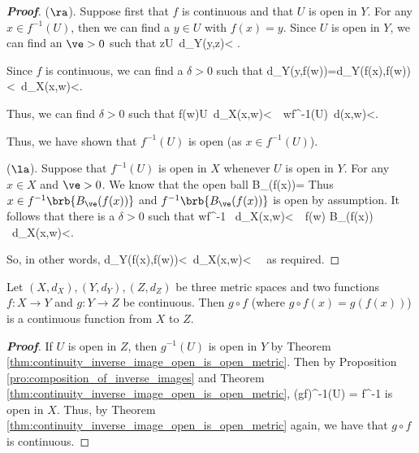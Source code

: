 \begin{proof}[\bf Proof]
($\ra$). Suppose first that $f$ is continuous and that $U$ is open in $Y$. For any $x\in f^{-1}(U)$, then we can find a $y\in U$ with $f(x)=y$. Since $U$ is open in $Y$, we can find an $\ve>0$ such that
\be
z\in U\quad {}\ d_Y(y,z)< \ve.
\ee

Since $f$ is continuous, we can find a $\delta>0$ such that
\be
d_Y(y,f(w))=d_Y(f(x),f(w))<\ve \quad {}\ d_X(x,w)<\delta.
\ee

Thus, we can find $\delta >0$ such that
\be
f(w)\in U\quad {}\ d_X(x,w)<\delta \ \ra \ w\in f^{-1}(U)\quad {}\ d(x,w)<\delta.
\ee

Thus, we have shown that $f^{-1}(U)$ is open (as $x\in f^{-1}(U)$).

($\la$). Suppose that $f^{-1}(U)$ is open in $X$ whenever $U$ is open in $Y$. For any $x\in X$ and $\ve>0$. We know that the open ball
\be
B_\ve(f(x))= \quad {}
\ee
Thus
$x\in f^{-1}\brb{B_\ve(f(x))}$ and $f^{-1}\brb{B_\ve(f(x))}$ is open by assumption. It follows that there is a $\delta>0$ such that
\be
w\in f^{-1} \quad {}\ d_X(x,w)<\delta \ \ra\  f(w) \in B_\ve(f(x)) \quad {}\ d_X(x,w)<\delta.
\ee

So, in other words,
\be
d_Y(f(x),f(w))<\ve\quad {}\ d_X(x,w)<\delta \ \ra \ 
\ee
as required.
\end{proof}



\begin{corollary}
Let $(X,d_X), (Y,d_Y), (Z,d_Z)$ be three metric spaces and two functions $f:X\to Y$ and $g:Y\to Z$ be continuous. Then $g\circ f$ (where $g\circ f(x) = g(f(x))$) is a continuous function from $X$ to $Z$.
\end{corollary}

\begin{proof}[\bf Proof]
If $U$ is open in $Z$, then $g^{-1}(U)$ is open in $Y$ by Theorem \ref{thm:continuity_inverse_image_open_is_open_metric}. Then by Proposition \ref{pro:composition_of_inverse_images} and Theorem \ref{thm:continuity_inverse_image_open_is_open_metric},
\be
(g\circ f)^{-1}(U) = f^{-1}
\ee
is open in $X$. Thus, by Theorem \ref{thm:continuity_inverse_image_open_is_open_metric} again, we have that $g\circ f$ is continuous.
\end{proof}




